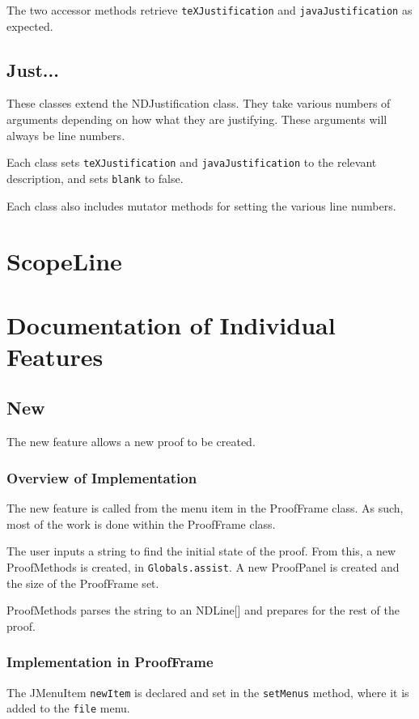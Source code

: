 \documentclass[a4paper]{article}
\begin{document}
The two accessor methods retrieve \texttt{teXJustification} and \texttt{javaJustification} as expected.

\subsection{Just...}
These classes extend the NDJustification class. They take various numbers of arguments depending on how what they are justifying. These arguments will always be line numbers.

Each class sets \texttt{teXJustification} and \texttt{javaJustification} to the relevant description, and sets \texttt{blank} to false.

Each class also includes mutator methods for setting the various line numbers.

\section{ScopeLine}


\section{Documentation of Individual Features}

\subsection{New}
The new feature allows a new proof to be created.

\subsubsection{Overview of Implementation}
The new feature is called from the menu item in the ProofFrame class. As such, most of the work is done within the ProofFrame class.

The user inputs a string to find the initial state of the proof. From this, a new ProofMethods is created, in \texttt{Globals.assist}. A new ProofPanel is created and the size of the ProofFrame set.

ProofMethods parses the string to an NDLine[] and prepares for the rest of the proof.

\subsubsection{Implementation in ProofFrame}
The JMenuItem \texttt{newItem} is declared and set in the \texttt{setMenus} method, where it is added to the \texttt{file} menu.
\end{document}
